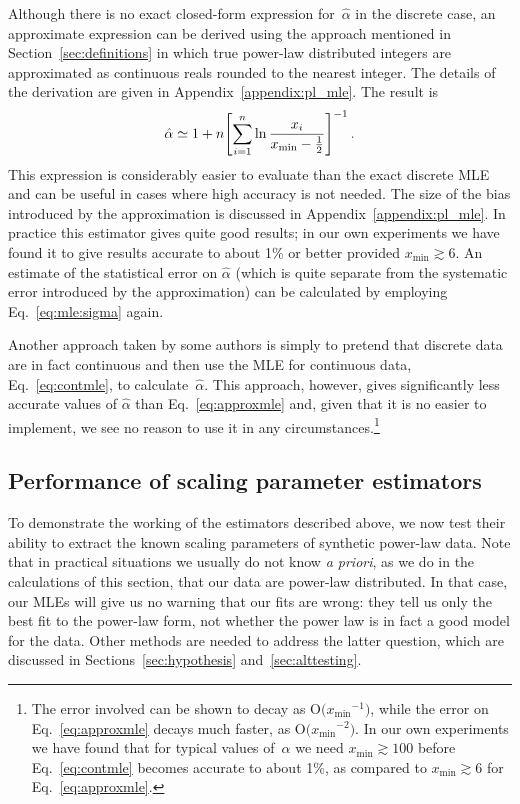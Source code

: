 \documentclass[final]{siamltex}
\newcommand{\half}{\mbox{$\frac12$}}
\newcommand{\Ord}{\mathrm{O}}
\newcommand{\xmin}{\ensuremath{x_{\min}}}
\newcommand{\punctspace}{\,}
\begin{document}
Although there is no exact closed-form expression for~$\hat{\alpha}$ in the
discrete case, an approximate expression can be derived using the approach
mentioned in Section~\ref{sec:definitions} in which true power-law
distributed integers are approximated as continuous reals rounded to the
nearest integer.  The details of the derivation are given in
Appendix~\ref{appendix:pl_mle}.  The result is
\begin{equation}
\hat{\alpha} \simeq 1 + n \Biggl[ \sum_{i=1}^n \ln {x_i\over \xmin-\half}
             \Biggr]^{-1}\punctspace.
\label{eq:approxmle}
\end{equation}
This expression is considerably easier to evaluate than the exact discrete
MLE and can be useful in cases where high accuracy is not needed.  The size
of the bias introduced by the approximation is discussed in
Appendix~\ref{appendix:pl_mle}.  In practice this estimator gives quite
good results; in our own experiments we have found it to give results
accurate to about 1\% or better provided $\xmin\gtrsim6$.  An estimate of
the statistical error on $\hat{\alpha}$ (which is quite separate from the
systematic error introduced by the approximation) can be calculated by
employing Eq.~\eqref{eq:mle:sigma} again.

Another approach taken by some authors is simply to pretend that discrete
data are in fact continuous and then use the MLE for continuous data,
Eq.~\eqref{eq:contmle}, to calculate~$\hat{\alpha}$.  This approach,
however, gives significantly less accurate values of $\hat{\alpha}$ than
Eq.~\eqref{eq:approxmle} and, given that it is no easier to implement, we
see no reason to use it in any circumstances.\footnote{The error involved
 can be shown to decay as $\Ord\bigl(\xmin^{-1}\bigr)$, while the error on
 Eq.~\eqref{eq:approxmle} decays much faster, as
 $\Ord\bigl(\xmin^{-2}\bigr)$.  In our own experiments we have found that
 for typical values of~$\alpha$ we need $\xmin\gtrsim100$ before
 Eq.~\eqref{eq:contmle} becomes accurate to about 1\%, as compared to
 $\xmin\gtrsim6$ for Eq.~\eqref{eq:approxmle}.}


\subsection{Performance of scaling parameter estimators}

To demonstrate the working of the estimators described above, we now test
their ability to extract the known scaling parameters of synthetic
power-law data.  Note that in practical situations we usually do not know
\textit{a priori}, as we do in the calculations of this section, that our
data are power-law distributed.  In that case, our MLEs will give us no
warning that our fits are wrong: they tell us only the best fit to the
power-law form, not whether the power law is in fact a good model for the
data.  Other methods are needed to address the latter question, which are
discussed in Sections~\ref{sec:hypothesis} and~\ref{sec:alttesting}.
\end{document}
